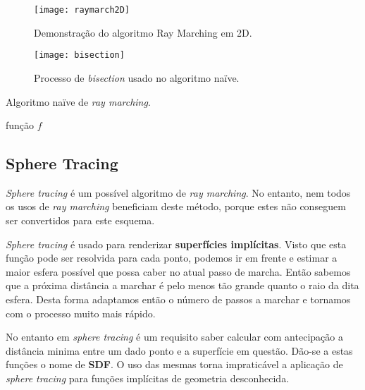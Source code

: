 \begin{figure}[!htbp]
    \centering
    \texttt{[image: raymarch2D]}
    \caption[Demonstração do algoritmo Ray Marching em 2D]{Demonstração do algoritmo Ray Marching em 2D.}
    \label{fig::rmarching2D}
\end{figure}

\begin{figure}[!htbp]
    \centering
    \texttt{[image: bisection]}
    \caption[Processo de \textit{bisection} usado no algoritmo naïve]{Processo de \textit{bisection} usado no algoritmo naïve.}
    \label{fig::rmarching2DBisection}
\end{figure}

\begin{algorithm}[!htbp]
	\caption{Algoritmo naïve de \textit{ray marching}.}
	\label{alg::raymarch_naive}
	\begin{algorithmic}
\Require função $f$      
	\end{algorithmic}
\end{algorithm}


\subsection{Sphere Tracing}
\label{ssec::arte:raymarch:spheretracing}


\textit{Sphere tracing} é um possível algoritmo de \textit{ray marching}. No entanto, nem todos os usos de \textit{ray marching} beneficiam deste método, porque estes não conseguem ser convertidos para este esquema.

\textit{Sphere tracing} é usado para renderizar \textbf{superfícies implícitas}. Visto que esta função pode ser resolvida para cada ponto, podemos ir em frente e estimar a maior esfera possível que possa caber no atual passo de marcha. Então sabemos que a próxima distância a marchar é pelo menos tão grande quanto o raio da dita esfera. Desta forma adaptamos então o número de passos a marchar e tornamos com o processo muito mais rápido.

No entanto em \textit{sphere tracing} é um requisito saber calcular com antecipação a distância minima entre um dado ponto e a superfície em questão. Dão-se a estas funções o nome de \textbf{\ac{SDF}}. O uso das mesmas torna impraticável a aplicação de \textit{sphere tracing} para funções implícitas de geometria desconhecida.

